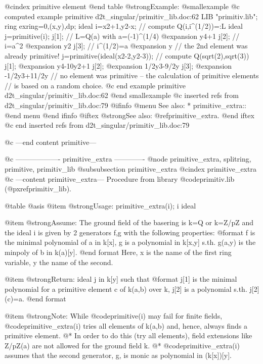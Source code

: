 @cindex primitive element
@end table
@strong{Example:}
@smallexample
@c computed example primitive d2t_singular/primitiv_lib.doc:62 
LIB "primitiv.lib";
ring exring=0,(x,y),dp;
ideal i=x2+1,y2-x;                  // compute Q(i,i^(1/2))=:L
ideal j=primitive(i);
j[1];                               // L=Q(a) with a=(-1)^(1/4)
@expansion{} y4+1
j[2];                               // i=a^2
@expansion{} y2
j[3];                               // i^(1/2)=a
@expansion{} y
// the 2nd element was already primitive!
j=primitive(ideal(x2-2,y2-3));      // compute Q(sqrt(2),sqrt(3))
j[1];
@expansion{} y4-10y2+1
j[2];
@expansion{} 1/2y3-9/2y
j[3];
@expansion{} -1/2y3+11/2y
// no element was primitive -- the calculation of primitive elements 
// is based on a random choice.
@c end example primitive d2t_singular/primitiv_lib.doc:62
@end smallexample
@c inserted refs from d2t_singular/primitiv_lib.doc:79
@ifinfo
@menu
See also:
* primitive_extra::
@end menu
@end ifinfo
@iftex
@strong{See also:}
@ref{primitive_extra}.
@end iftex
@c end inserted refs from d2t_singular/primitiv_lib.doc:79

@c ---end content primitive---

@c ------------------- primitive_extra -------------
@node primitive_extra, splitring, primitive, primitiv_lib
@subsubsection primitive_extra
@cindex primitive_extra
@c ---content primitive_extra---
Procedure from library @code{primitiv.lib} (@pxref{primitiv_lib}).

@table @asis
@item @strong{Usage:}
primitive_extra(i); i ideal

@item @strong{Assume:}
The ground field of the basering is k=Q or k=Z/pZ and the ideal
i is given by 2 generators f,g with the following properties:
@format
   f is the minimal polynomial of a in k[x], 
   g is a polynomial in k[x,y] s.th. g(a,y) is the minpoly of b in k(a)[y].
@end format
Here, x is the name of the first ring variable, y the name of the
second.

@item @strong{Return:}
ideal j in k[y] such that
@format
   j[1] is the minimal polynomial for a primitive element c of k(a,b) over k,
   j[2] is a polynomial s.th. j[2](c)=a.
@end format

@item @strong{Note:}
While @code{primitive(i)} may fail for finite fields,
@code{primitive_extra(i)} tries all elements of k(a,b) and, hence,
always finds a primitive element. @*
In order to do this (try all elements), field extensions like Z/pZ(a)
are not allowed for the ground field k. @*
@code{primitive_extra(i)} assumes that the second generator, g, is
monic as polynomial in (k[x])[y].


